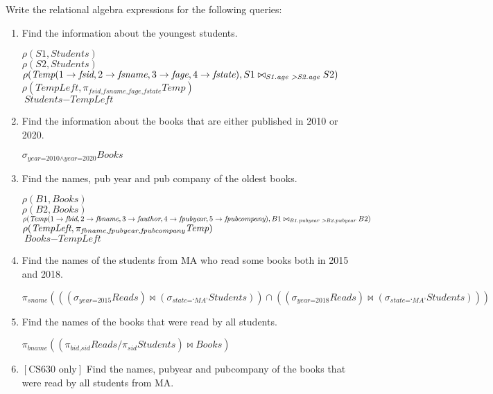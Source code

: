 \documentclass[letterpaper, 11pt]{article}
\begin{document}
Write the relational algebra expressions for the following queries:
\begin{enumerate}[label={\alph*})]
    \item Find the information about the youngest students.
    
    $\rho(S1, \textit{Students})$\\
    $\rho(S2, \textit{Students})$\\
    $\rho(\textit{Temp}(1 \to \textit{fsid}, 2 \to \textit{fsname}, 3 \to \textit{fage}, 4 \to \textit{fstate}), S1 \bowtie_{\textit{S1.age \textgreater S2.age}}S2)$\\
    $\rho(\textit{TempLeft}, \pi_{\textit{fsid,fsname,fage,fstate}}\textit{Temp})$\\
    $\textit{Students} - \textit{TempLeft}$
    
    \item Find the information about the books that are either published in 2010 or 2020.

    $\sigma_{\textit{year=2010} \wedge \textit{year=2020}}\textit{Books}$
    
    \item Find the names, pub year and pub company of the oldest books.

    $\rho(B1, \textit{Books})$\\
    $\rho(B2, \textit{Books})$\\
    $\rho(\textit{Temp}(1 \to \textit{fbid}, 2 \to \textit{fbname}, 3 \to \textit{fauthor}, 4 \to \textit{fpubyear}, 5 \to \textit{fpubcompany}), B1 \bowtie_{\textit{B1.pubyear \textgreater B2.pubyear}} B2)$\\
    $\rho(\textit{TempLeft}, \pi_{\textit{fbname,fpubye\textit{}ar,fpubcompany}}\textit{Temp})$\\
    $\textit{Books} - \textit{TempLeft}$
    
    \item Find the names of the students from MA who read some books both in 2015 and 2018.

    $\pi_{\textit{sname}}(((\sigma_{\textit{year=2015}}\textit{Reads}) \bowtie (\sigma_{\textit{state=`MA'}}\textit{Students})) \cap ((\sigma_{\textit{year=2018}}\textit{Reads}) \bowtie (\sigma_{\textit{state=`MA'}}\textit{Students})))$
    
    \item Find the names of the books that were read by all students.

    $\pi_{\textit{bname}}((\pi_{\textit{bid,sid}}\textit{Reads} / \pi_{\textit{sid}}\textit{Students}) \bowtie \textit{Books})$
    
    \item $\left[\text{CS630 only}\right]$ Find the names, pubyear and pubcompany of the books that were read by all students from MA.
\end{enumerate}
\end{document}
